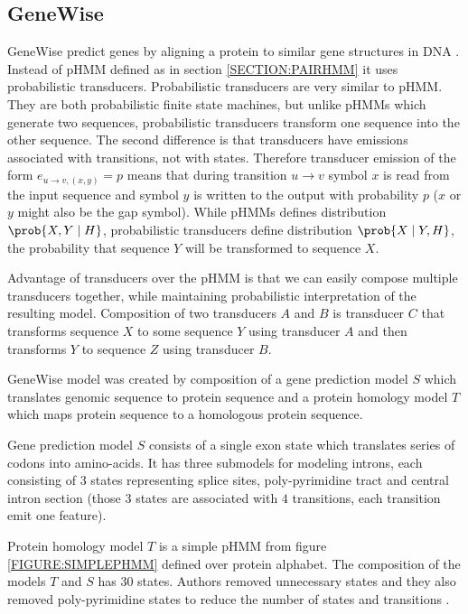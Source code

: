 \subsection{GeneWise}

GeneWise predict genes by aligning a protein  to similar gene structures in DNA
\cite{GeneWise2004}. Instead of pHMM defined as in section \ref{SECTION:PAIRHMM}
it uses probabilistic transducers. Probabilistic transducers are very similar to
pHMM. They are both probabilistic finite state machines, but unlike pHMMs which
generate two sequences, probabilistic transducers transform one sequence into
the other sequence.  The second difference is that transducers have emissions
associated with transitions, not with states.  Therefore transducer emission of
the form $e_{u\to v,(x,y)}=p$ means that during transition $u\to v$ symbol $x$
is read from the input sequence and symbol $y$ is written to the output with
probability $p$ ($x$ or $y$ might also be the gap symbol).  While pHMMs defines
distribution $\prob{X,Y\mid H}$, probabilistic transducers define distribution
$\prob{X\mid Y,H}$, the probability that sequence $Y$ will be transformed to
sequence $X$.

Advantage of transducers over the pHMM is that we can easily compose multiple
transducers together, while maintaining probabilistic interpretation of the
resulting model.  Composition of two transducers $A$ and $B$ is transducer $C$
that transforms sequence $X$ to some sequence $Y$ using transducer $A$ and then
transforms $Y$ to sequence $Z$ using transducer $B$. 

GeneWise model was created by composition of a gene prediction model $S$ which
translates genomic sequence to protein sequence and a protein homology model $T$
which maps protein sequence to a homologous protein sequence.

Gene prediction model $S$ consists of a single exon state which translates
series of codons into amino-acids. It has three submodels for modeling introns,
each consisting of $3$ states representing  splice sites, poly-pyrimidine tract
and central intron section (those $3$ states are associated with $4$
transitions, each transition emit one feature). 

Protein homology model $T$ is a simple pHMM from figure \ref{FIGURE:SIMPLEPHMM}
defined over protein alphabet.  The composition of the models $T$ and $S$ has
$30$ states. Authors removed unnecessary states and they also removed
poly-pyrimidine states to reduce the number of states and transitions
\cite{GeneWise2004}.



